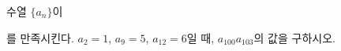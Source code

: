 수열 $\{a_n\}$이\par\smallskip{}\par\smallskip\noindent 를 만족시킨다. $a_2=1$, $a_9=5$, $a_{12}=6$일 때, $a_{100}a_{103}$의 값을 구하시오.
